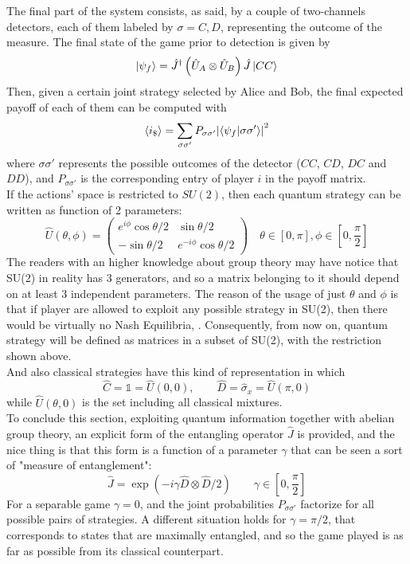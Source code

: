 The final part of the system consists, as said, by a couple of two-channels detectors, each of them labeled by $\sigma=C,D$, representing the outcome of the measure. The final state of the game prior to detection is given by
\[ \ket{\psi_f} = \hat{J}^\dagger\left(\hat{U}_A\otimes\hat{U}_B\right)\hat{J}\ket{CC} \]
Then, given a certain joint strategy selected by Alice and Bob, the final expected payoff of each of them can be computed with
\[ \expval{i_\$} = \sum_{\sigma\sigma'} P_{\sigma\sigma'}\abs{\bra{\psi_f}\ket{\sigma\sigma'}}^2 \]
where $\sigma\sigma'$ represents the possible outcomes of the detector ($CC$, $CD$, $DC$ and $DD$), and $P_{\sigma\sigma'}$ is the corresponding entry of player $i$ in the payoff matrix.\\
If the actions' space is restricted to $SU(2)$, then each quantum strategy can be written as function of 2 parameters:
\[ \hat{U}(\theta,\phi) = \begin{pmatrix}
e^{i\phi}\cos\theta/2 & \sin\theta/2 \\ -\sin\theta/2 & e^{-i\phi}\cos\theta/2
\end{pmatrix} \quad \theta\in[0,\pi], \phi\in[0,\frac{\pi}{2}] \]
The readers with an higher knowledge about group theory may have notice that SU(2) in reality has 3 generators, and so a matrix belonging to it should depend on at least 3 independent parameters. The reason of the usage of just $\theta$ and $\phi$ is that if player are allowed to exploit any possible strategy in SU(2), then there would be virtually no Nash Equilibria, \cite{Du_2000}. Consequently, from now on, quantum strategy will be defined as matrices in a subset of SU(2), with the restriction shown above.\\
And also classical strategies have this kind of representation in which
\[ \hat{C} = \mathds{1} = \hat{U}(0,0), \qquad \hat{D} = \hat{\sigma}_x = \hat{U}(\pi,0) \]
while $\hat{U}(\theta,0)$ is the set including all classical mixtures.\\
To conclude this section, exploiting quantum information together with abelian group theory, an explicit form of the entangling operator $\hat{J}$ is provided, and the nice thing is that this form is a function of a parameter $\gamma$ that can be seen a sort of "measure of entanglement":
\[ \hat{J} = \exp\left(-i\gamma\hat{D}\otimes\hat{D}/2\right) \qquad \gamma\in[0,\frac{\pi}{2}] \]
For a separable game $\gamma=0$, and the joint probabilities $P_{\sigma\sigma'}$ factorize for all possible pairs of strategies. A different situation holds for $\gamma = \pi/2$, that corresponds to states that are maximally entangled, and so the game played is as far as possible from its classical counterpart. 






